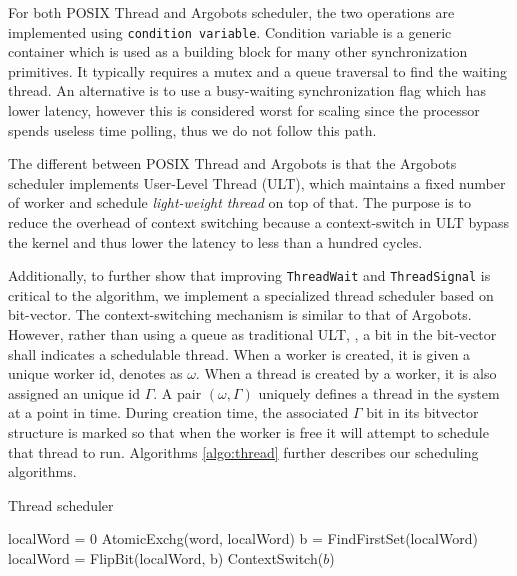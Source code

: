 For both POSIX Thread and Argobots scheduler, the two operations are
implemented using \texttt{condition variable}. Condition variable is a generic
container which is used as a building block for many other synchronization
primitives. It typically requires a mutex and a queue traversal to find the
waiting thread. An alternative is to use a busy-waiting synchronization flag
which has lower latency, however this is considered worst for scaling since the
processor spends useless time polling, thus we do not follow this path.

The different between POSIX Thread and Argobots is that the Argobots scheduler
implements User-Level Thread (ULT), which maintains a fixed number of worker
and schedule \textit{light-weight thread} on top of that. The purpose is to
reduce the overhead of context switching because a context-switch in ULT bypass
the kernel and thus lower the latency to less than a hundred cycles.

Additionally, to further show that improving \texttt{ThreadWait} and
\texttt{ThreadSignal} is critical to the algorithm, we implement a specialized
thread scheduler based on bit-vector. The context-switching mechanism is
similar to that of Argobots. However, rather than using a queue as traditional
ULT, , a bit in the bit-vector shall indicates a schedulable thread. When a
worker is created, it is given a unique worker id, denotes as $\omega$.  When a
thread is created by a worker, it is also assigned an unique id $\Gamma$.  A
pair $(\omega, \Gamma)$ uniquely defines a thread in the system at a point in
time. During creation time, the associated $\Gamma$ bit in its bitvector
structure is marked so that when the worker is free it will attempt to schedule
that thread to run. Algorithms \ref{algo:thread} further describes our
scheduling algorithms. 

\begin{algorithm}
  \caption{Thread scheduler}
  \label{algo:thread}
  \begin{algorithmic}[1]
     
     
        \State localWord = 0
        \State AtomicExchg(word, localWord)
          \State b = FindFirstSet(localWord)
          \State localWord = FlipBit(localWord, b)
          \State ContextSwitch($b$)
        \EndWhile
      \EndIf
      \EndFor
    \EndWhile
    \EndProcedure
  \end{algorithmic}
\end{algorithm}

